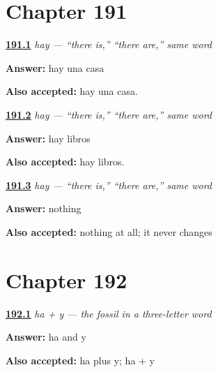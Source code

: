 \section*{Chapter 191}

\noindent\begin{minipage}[t]{\linewidth}
\raggedright
\hyperlink{review-ES-C54-hay-one}{\textbf{191.1}} \emph{hay — \textquotedblleft{}there is,\textquotedblright{} \textquotedblleft{}there are,\textquotedblright{} same word}\par
\small \textbf{Answer:} hay una casa\par
\footnotesize \textbf{Also accepted:} hay una casa.
\end{minipage}\par\medskip

\noindent\begin{minipage}[t]{\linewidth}
\raggedright
\hyperlink{review-ES-C54-hay-many}{\textbf{191.2}} \emph{hay — \textquotedblleft{}there is,\textquotedblright{} \textquotedblleft{}there are,\textquotedblright{} same word}\par
\small \textbf{Answer:} hay libros\par
\footnotesize \textbf{Also accepted:} hay libros.
\end{minipage}\par\medskip

\noindent\begin{minipage}[t]{\linewidth}
\raggedright
\hyperlink{review-ES-C54-hay-unique}{\textbf{191.3}} \emph{hay — \textquotedblleft{}there is,\textquotedblright{} \textquotedblleft{}there are,\textquotedblright{} same word}\par
\small \textbf{Answer:} nothing\par
\footnotesize \textbf{Also accepted:} nothing at all; it never changes
\end{minipage}\par\medskip

\section*{Chapter 192}

\noindent\begin{minipage}[t]{\linewidth}
\raggedright
\hyperlink{review-ES-C54-ha-mas-y-parts}{\textbf{192.1}} \emph{ha + y — the fossil in a three-letter word}\par
\small \textbf{Answer:} ha and y\par
\footnotesize \textbf{Also accepted:} ha plus y; ha + y
\end{minipage}\par\medskip

